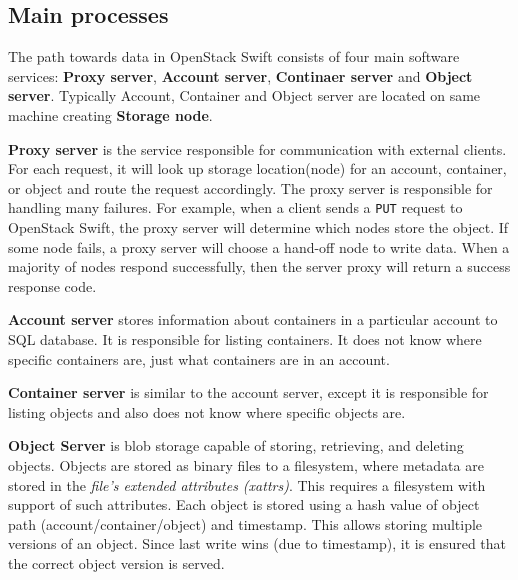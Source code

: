 \documentclass{ExcelAtFIT}
\begin{document}
\subsection{Main processes}
The path towards data in OpenStack Swift consists of four main software services: \textbf{Proxy server}, \textbf{Account server}, \textbf{Continaer server} and \textbf{Object server}. Typically Account, Container and Object server are located on same machine creating \textbf{Storage node}.

\textbf{Proxy server} is the service responsible for communication with external clients. For each request, it will look up storage location(node) for an account, container, or object and route the request accordingly\cite{SwiftArchitecturalOverview}. The proxy server is responsible for handling many failures. For example, when a client sends a \texttt{PUT} request to OpenStack Swift, the proxy server will determine which nodes store the object. If some node fails, a proxy server will choose a hand-off node to write data. When a majority of nodes respond successfully, then the server proxy will return a success response code\cite{swiftOpenStackSwift}.

\textbf{Account server} stores information about containers in a particular account to SQL database. It is responsible for listing containers. It does not know where specific containers are, just what containers are in an account\cite{SwiftArchitecturalOverview}.

\textbf{Container server} is similar to the account server, except it is responsible for listing objects and also does not know where specific objects are\cite{SwiftArchitecturalOverview}.

\textbf{Object Server} is blob storage capable of storing, retrieving, and deleting objects. Objects are stored as binary files to a filesystem, where metadata are stored in the \textit{file's extended attributes (xattrs)}. This requires a filesystem with support of such attributes. Each object is stored using a hash value of object path (account/container/object) and timestamp. This allows storing multiple versions of an object. Since last write wins (due to timestamp), it is ensured that the correct object version is served\cite{SwiftArchitecturalOverview}.
\end{document}

